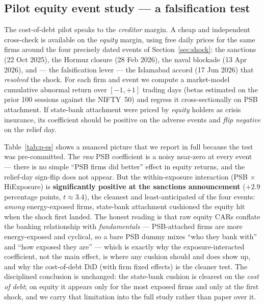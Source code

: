 \documentclass[12pt]{article}
\begin{document}
\subsection{Pilot equity event study --- a falsification test}\label{sec:pilot-es}

The cost-of-debt pilot speaks to the \emph{creditor} margin. A cheap and independent
cross-check is available on the \emph{equity} margin, using free daily prices for the same
firms around the four precisely dated events of Section~\ref{sec:shock}: the sanctions
(22 Oct 2025), the Hormuz closure (28 Feb 2026), the naval blockade (13 Apr 2026), and ---
the falsification lever --- the Islamabad accord (17 Jun 2026) that \emph{resolved} the
shock. For each firm and event we compute a market-model cumulative abnormal return over
$[-1,+1]$ trading days (betas estimated on the prior 100 sessions against the NIFTY~50) and
regress it cross-sectionally on PSB attachment. If state-bank attachment were priced by
\emph{equity} holders as crisis insurance, its coefficient should be positive on the
adverse events and \emph{flip negative} on the relief day.

Table~\ref{tab:p-es} shows a nuanced picture that we report in full because the test was
pre-committed. The \emph{raw} PSB coefficient is a noisy near-zero at every event --- there
is no simple ``PSB firms did better'' effect in equity returns, and the relief-day sign-flip
does not appear. But the within-exposure interaction (PSB $\times$ HiExposure) is
\textbf{significantly positive at the sanctions announcement} ($+2.9$ percentage points,
$t\approx3.4$), the cleanest and least-anticipated of the four events: \emph{among}
energy-exposed firms, state-bank attachment cushioned the equity hit when the shock first
landed. The honest reading is that raw equity CARs conflate the banking relationship with
\emph{fundamentals} --- PSB-attached firms are more energy-exposed and cyclical, so a bare
PSB dummy mixes ``who they bank with'' and ``how exposed they are'' --- which is exactly why
the exposure-interacted coefficient, not the main effect, is where any cushion should and
does show up, and why the cost-of-debt DiD (with firm fixed effects) is the cleaner test.
The disciplined conclusion is unchanged: the state-bank cushion is clearest on the
\emph{cost of debt}; on equity it appears only for the most exposed firms and only at the
first shock, and we carry that limitation into the full study rather than paper over it.
\end{document}
